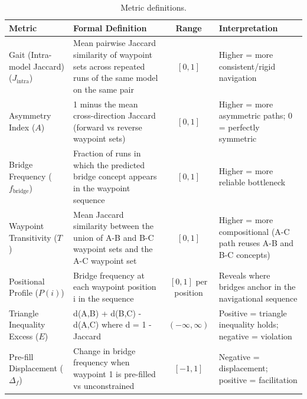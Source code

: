\begin{table}[t]
\centering
\caption{Metric definitions.}
\label{tab:metrics}
\small
\begin{tabular}{l p{5.0cm} c p{4.0cm}}
\toprule
Metric & Formal Definition & Range & Interpretation \\
\midrule
    Gait (Intra-model Jaccard) ($J_{\text{intra}}$) & Mean pairwise Jaccard similarity of waypoint sets across repeated runs of the same model on the same pair & $[0, 1]$ & Higher = more consistent/rigid navigation \\
    Asymmetry Index ($A$) & 1 minus the mean cross-direction Jaccard (forward vs reverse waypoint sets) & $[0, 1]$ & Higher = more asymmetric paths; 0 = perfectly symmetric \\
    Bridge Frequency ($f_{\text{bridge}}$) & Fraction of runs in which the predicted bridge concept appears in the waypoint sequence & $[0, 1]$ & Higher = more reliable bottleneck \\
    Waypoint Transitivity ($T$) & Mean Jaccard similarity between the union of A-B and B-C waypoint sets and the A-C waypoint set & $[0, 1]$ & Higher = more compositional (A-C path reuses A-B and B-C concepts) \\
    Positional Profile ($P(i)$) & Bridge frequency at each waypoint position i in the sequence & $[0, 1]$ per position & Reveals where bridges anchor in the navigational sequence \\
    Triangle Inequality Excess ($E$) & d(A,B) + d(B,C) - d(A,C) where d = 1 - Jaccard & $(-\infty, \infty)$ & Positive = triangle inequality holds; negative = violation \\
    Pre-fill Displacement ($\Delta_{f}$) & Change in bridge frequency when waypoint 1 is pre-filled vs unconstrained & $[-1, 1]$ & Negative = displacement; positive = facilitation \\
\bottomrule
\end{tabular}
\end{table}

